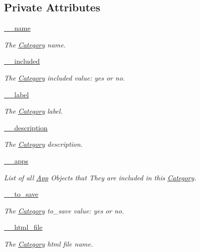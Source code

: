 \subsection*{Private Attributes}
\begin{CompactItemize}
\item 
\hyperlink{classwinsollib_1_1Category_9d9c3c375dfdf0cbb19538a63e6400f0}{\_\-\_\-name}
\begin{CompactList}\small\item\em The \hyperlink{classwinsollib_1_1Category}{Category} name. \item\end{CompactList}\item 
\hyperlink{classwinsollib_1_1Category_bdc064b23cc9cb3946b54d381f4401e3}{\_\-\_\-included}
\begin{CompactList}\small\item\em The \hyperlink{classwinsollib_1_1Category}{Category} included value: yes or no. \item\end{CompactList}\item 
\hyperlink{classwinsollib_1_1Category_338710a520a7af2b63f420f1645a6fcc}{\_\-\_\-label}
\begin{CompactList}\small\item\em The \hyperlink{classwinsollib_1_1Category}{Category} label. \item\end{CompactList}\item 
\hyperlink{classwinsollib_1_1Category_5351cf0c97649f60867873ee04fbdb5c}{\_\-\_\-description}
\begin{CompactList}\small\item\em The \hyperlink{classwinsollib_1_1Category}{Category} description. \item\end{CompactList}\item 
\hyperlink{classwinsollib_1_1Category_e30337cdf109003959f326527a23c231}{\_\-\_\-apps}
\begin{CompactList}\small\item\em List of all \hyperlink{classwinsollib_1_1App}{App} Objects that They are included in this \hyperlink{classwinsollib_1_1Category}{Category}. \item\end{CompactList}\item 
\hyperlink{classwinsollib_1_1Category_fc807dfc0cabe6235b1bcc1417fef611}{\_\-\_\-to\_\-save}
\begin{CompactList}\small\item\em The \hyperlink{classwinsollib_1_1Category}{Category} to\_\-save value: yes or no. \item\end{CompactList}\item 
\hyperlink{classwinsollib_1_1Category_47f46cbec7d249f1dc80655eaf732895}{\_\-\_\-html\_\-file}
\begin{CompactList}\small\item\em The \hyperlink{classwinsollib_1_1Category}{Category} html file name. \item\end{CompactList}\end{CompactItemize}


